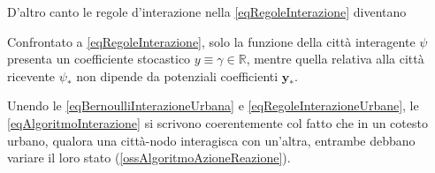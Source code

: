                 D'altro canto le regole d'interazione nella \ref{eqRegoleInterazione} diventano
                \begin{oss}
                    Confrontato a \ref{eqRegoleInterazione}, solo la funzione della città interagente \(\psi\) presenta un coefficiente stocastico \(y\equiv\gamma\in\mathbb R\), mentre quella relativa alla città ricevente \(\psi_*\) non dipende da potenziali coefficienti\footnotemark{} \(\mathbf y_*\).%
                \end{oss}

                Unendo le \ref{eqBernoulliInterazioneUrbana} e \ref{eqRegoleInterazioneUrbane}, le \ref{eqAlgoritmoInterazione} si scrivono
                coerentemente col fatto che in un cotesto urbano, qualora una città-nodo interagisca con un'altra, entrambe debbano variare il loro stato (\cref{ossAlgoritmoAzioneReazione}).


